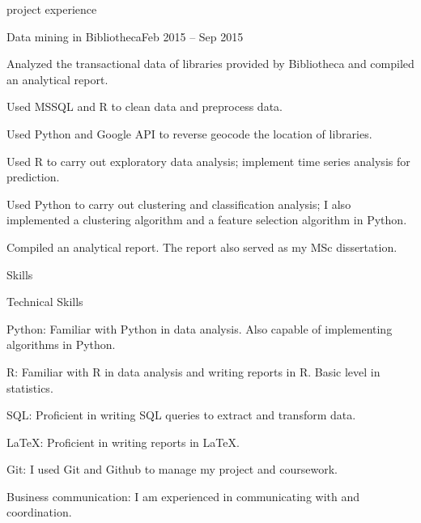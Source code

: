 \documentclass{resume} %
\begin{document}
\begin{rSection}{project experience}

\begin{rSubsection}{Data mining in Bibliotheca}{Feb 2015 -- Sep 2015}{}{}
\item Analyzed the transactional data of libraries provided by Bibliotheca and compiled an analytical report.
\item Used MSSQL and R to clean data and preprocess data.
\item Used Python and Google API to reverse geocode the location of libraries.
\item Used R to carry out exploratory data analysis; implement time series analysis for prediction.
\item Used Python to carry out clustering and classification analysis; I also implemented a clustering algorithm and a feature selection algorithm in Python.
\item Compiled an analytical report. The report also served as my MSc dissertation.

\end{rSubsection}

\end{rSection}




\begin{rSection}{Skills}

\begin{rSubsection}{Technical Skills}{}{}{}
\item {Python:} Familiar with Python in data analysis. Also capable of implementing algorithms in Python.
\item {R:} Familiar with R in data analysis and writing reports in R. Basic level in statistics.
\item {SQL:} Proficient in writing SQL queries to extract and transform data.
\item {\LaTeX{}:} Proficient in writing reports in \LaTeX{}.
\item{Git}: I used Git and Github to manage my project and coursework.
\item {Business communication:} I am experienced in communicating with and coordination.
\end{rSubsection}

\end{rSection}
\end{document}
